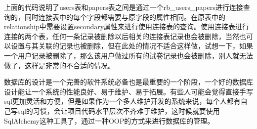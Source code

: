 上面的代码说明了users表和papers表之间是通过一个rb\_users\_papers进行连接查询的，同时连接表中的每个字段都需要与原字段的属性相同。在原表中的relationship中需要设置secondary属性来进行使用连接表的查询。使用连接表进行连接的两个表，任何一条记录被删除以后相关的连接表记录也会被删除，当然也可以设置与其关联的记录也被删除，但在此处的情况不适合这样做，试想一下，如果一个用户记录被删除了，那么该用户做过所有的试卷记录也会被删除，别人就无法做了，这样是非常的不合适的情况。

数据库的设计是一个完善的软件系统必备也是最重要的一个阶段，一个好的数据库设计能让一个系统的性能良好、易于维护、易于拓展。有些人可能会觉得直接手写sql更加灵活和方便，但是如果作为一个多人维护开发的系统来说，每个人都有自己写sql的习惯，会让项目代码水平层次不齐难于维护，这时候就要使用SqlAlchemy这种工具了，通过一种OOP的方式来进行数据库的管理。